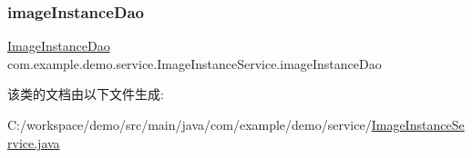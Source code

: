 \subsubsection{\texorpdfstring{image\+Instance\+Dao}{imageInstanceDao}}
{\footnotesize\ttfamily \mbox{\hyperlink{interfacecom_1_1example_1_1demo_1_1dao_1_1_image_instance_dao}{Image\+Instance\+Dao}} com.\+example.\+demo.\+service.\+Image\+Instance\+Service.\+image\+Instance\+Dao\hspace{0.3cm}{\ttfamily [package]}}



该类的文档由以下文件生成\+:\begin{DoxyCompactItemize}
\item 
C\+:/workspace/demo/src/main/java/com/example/demo/service/\mbox{\hyperlink{_image_instance_service_8java}{Image\+Instance\+Service.\+java}}\end{DoxyCompactItemize}
